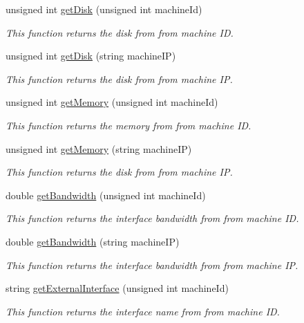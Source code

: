 \begin{DoxyCompactItemize}
unsigned int \hyperlink{classPhysicalMachines_af45a4debab293a931d380c8601cc1593}{get\-Disk} (unsigned int machine\-Id)
\begin{DoxyCompactList}\small\item\em \-This function returns the disk from from machine \-I\-D. \end{DoxyCompactList}\item 
unsigned int \hyperlink{classPhysicalMachines_ac48ecd99fa7d3e7fd2e77b374a60c8c2}{get\-Disk} (string machine\-I\-P)
\begin{DoxyCompactList}\small\item\em \-This function returns the disk from from machine \-I\-P. \end{DoxyCompactList}\item 
unsigned int \hyperlink{classPhysicalMachines_a2fa63853fdb845f69ac1b4385464a13c}{get\-Memory} (unsigned int machine\-Id)
\begin{DoxyCompactList}\small\item\em \-This function returns the memory from from machine \-I\-D. \end{DoxyCompactList}\item 
unsigned int \hyperlink{classPhysicalMachines_a65f7b3f94eeca683922b0d61952c564f}{get\-Memory} (string machine\-I\-P)
\begin{DoxyCompactList}\small\item\em \-This function returns the disk from from machine \-I\-P. \end{DoxyCompactList}\item 
double \hyperlink{classPhysicalMachines_ad2a76ebe8d130355b44094f11a9e400d}{get\-Bandwidth} (unsigned int machine\-Id)
\begin{DoxyCompactList}\small\item\em \-This function returns the interface bandwidth from from machine \-I\-D. \end{DoxyCompactList}\item 
double \hyperlink{classPhysicalMachines_a11647bb2067584239b689c7845d5fd92}{get\-Bandwidth} (string machine\-I\-P)
\begin{DoxyCompactList}\small\item\em \-This function returns the interface bandwidth from from machine \-I\-P. \end{DoxyCompactList}\item 
string \hyperlink{classPhysicalMachines_a13c4eeea1dee8652b5e93c62099fe6af}{get\-External\-Interface} (unsigned int machine\-Id)
\begin{DoxyCompactList}\small\item\em \-This function returns the interface name from from machine \-I\-D. \end{DoxyCompactList}\item 

\end{DoxyCompactItemize}
